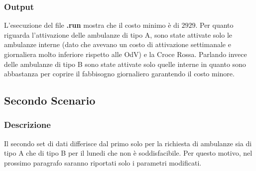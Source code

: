 \subsubsection{Output}
L'esecuzione del file \textbf{.run} mostra che il costo minimo è di \texteuro$2929$. Per quanto riguarda l'attivazione delle ambulanze di tipo A, sono state attivate solo le ambulanze interne (dato che avevano un costo di attivazione settimanale e giornaliera molto inferiore rispetto alle OdV) e la Croce Rossa. Parlando invece delle ambulanze di tipo B sono state attivate solo quelle interne in quanto sono abbastanza per coprire il fabbisogno giornaliero garantendo il costo minore.

\subsection{Secondo Scenario}
\subsubsection{Descrizione}
Il secondo set di dati differisce dal primo solo per la richiesta di ambulanze sia di tipo A che di tipo B per il lunedi che non è soddisfacibile. Per questo motivo, nel prossimo paragrafo saranno riportati solo i parametri modificati.
